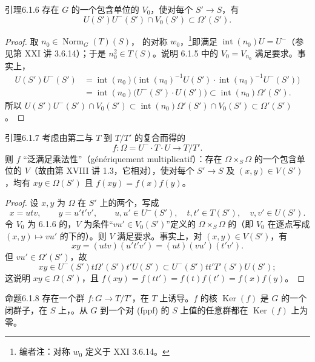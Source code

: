 \begin{SGAresult}{引理}{6.1.6}
存在 $G$ 的一个包含单位的 $V_0$，使对每个 $S'\to S$，有
\[U(S')U^-(S')\cap V_0(S')\subset\Omega'(S').\]
\end{SGAresult}
\begin{proof}
取 $n_0\in\operatorname{Norm}_G(T)(S)$， 的对称 $w_0$，\footnote{编者注：对称 $w_0$ 定义于 XXI 3.6.14。}即满足 $\operatorname{int}(n_0)U=U^-$（参见第 XXI 讲 3.6.14）；于是 $n_0^2\in T(S)$。说明 6.1.5 中的 $V_0=V_{n_0}$ 满足要求。事实上，
\[\begin{split}
U(S')U^-(S')
&=\operatorname{int}(n_0)\bigl(\operatorname{int}(n_0)^{-1}U(S')\cdot\operatorname{int}(n_0)^{-1}U^-(S')\bigr)\\
&=\operatorname{int}(n_0)\bigl(U^-(S')\cdot U(S')\bigr)\subset\operatorname{int}(n_0)\Omega'(S').
\end{split}\]
所以 $U(S')U^-(S')\cap V_0(S')\subset\operatorname{int}(n_0)\Omega'(S')\cap V_0(S')\subset\Omega'(S')$。
\end{proof}
\begin{SGAresult}{引理}{6.1.7}
考虑由第二与 $T$ 到 $T/T'$ 的复合而得的
\[f:\Omega=U^-\cdot T\cdot U\longrightarrow T/T'.\]
则 $f$ “泛满足乘法性”（génériquement multiplicatif）：存在 $\Omega\times_S\Omega$ 的一个包含单位的 $V$（故由第 XVIII 讲 1.3，它相对），使对每个 $S'\to S$ 及 $(x,y)\in V(S')$，均有 $xy\in\Omega(S')$ 且 $f(xy)=f(x)f(y)$。
\end{SGAresult}
\begin{proof}
设 $x,y$ 为 $\Omega$ 在 $S'$ 上的两个，写成
\[x=utv,\qquad y=u't'v',\qquad
u,u'\in U^-(S'),\quad t,t'\in T(S'),\quad v,v'\in U(S').\]
令 $V_0$ 为 6.1.6 的，$V$ 为条件“$vu'\in V_0(S')$”定义的 $\Omega\times_S\Omega$ 的（即 $V_0$ 在逐点写成 $(x,y)\mapsto vu'$ 的下的）。则 $V$ 满足要求。事实上，对 $(x,y)\in V(S')$，有
\[xy=(utv)(u't'v')=(ut)(vu')(t'v').\]
但 $vu'\in\Omega'(S')$，故
\[xy\in U^-(S')t\Omega'(S')t'U(S')\subset U^-(S')tt'T'(S')U(S');\]
这说明 $xy\in\Omega(S')$，且 $f(xy)=f(tt')=f(t)f(t')=f(x)f(y)$。
\end{proof}
\begin{SGAresult}{命题}{6.1.8}
存在一个群 $f:G\to T/T'$，在 $T$ 上诱导。$f$ 的核 $\operatorname{Ker}(f)$ 是 $G$ 的一个闭群子，在 $S$ 上，。从 $G$ 到一个对 (fppf) 的 $S$ 上值的任意群都在 $\operatorname{Ker}(f)$ 上为零。
\end{SGAresult}
